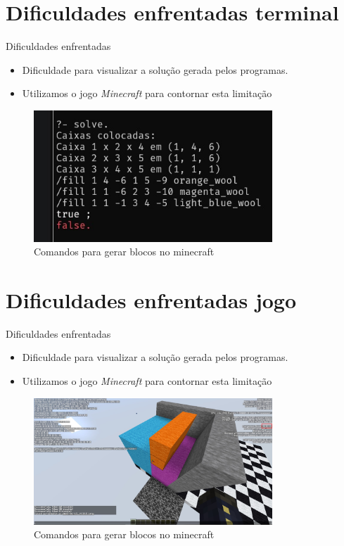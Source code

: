 \documentclass{beamer}
\begin{document}
\section{Dificuldades enfrentadas terminal}
\begin{frame}{Dificuldades enfrentadas}
	\begin{itemize}
		\item Dificuldade para visualizar a solução gerada pelos programas.
		\item Utilizamos o jogo \textit{Minecraft} para contornar esta limitação
	\end{itemize}

	\begin{figure}
		\centering
		\includegraphics[width=0.8\textwidth]{minecraft-terminal.jpg}
		\caption{Comandos para gerar blocos no minecraft}
	\end{figure}
\end{frame}

\section{Dificuldades enfrentadas jogo}
\begin{frame}{Dificuldades enfrentadas}
	\begin{itemize}
		\item Dificuldade para visualizar a solução gerada pelos programas.
		\item Utilizamos o jogo \textit{Minecraft} para contornar esta limitação
	\end{itemize}

	\begin{figure}
		\centering
		\includegraphics[width=0.8\textwidth]{minecraft-jogo.jpg}
		\caption{Comandos para gerar blocos no minecraft}
	\end{figure}
\end{frame}
\end{document}
